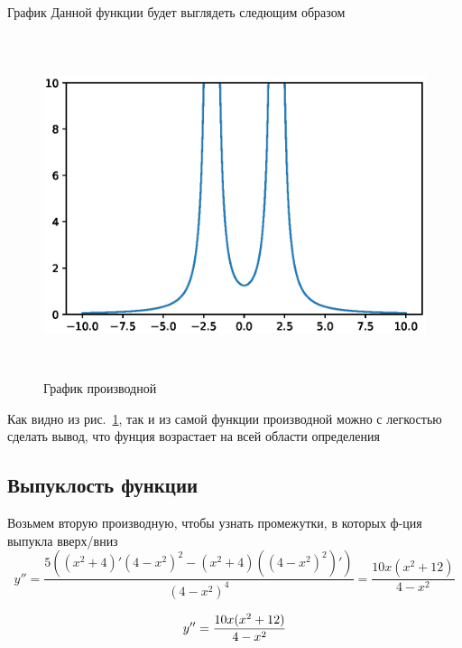    График Данной функции будет выглядеть следющим образом \cite{matplotlib}
    \begin{figure}[H]
        \centering
        \includegraphics[height=10cm, width=15cm]{fig/firstDer.eps}
        \caption{График производной}
        \label{pic:derivative}
    \end{figure}
    Как видно из рис.~\ref{pic:derivative}, так и из самой функции производной можно с легкостью сделать вывод, что фунция возрастает на всей области определения
    
    

    
    
\subsection{Выпуклость функции}
    Возьмем вторую производную, чтобы узнать промежутки, в которых ф-ция выпукла вверх/вниз
    \begin{equation*}
        y'' = \frac{5((x^2+4)'(4-x^2)^2-(x^2+4)((4-x^2)^2)')}{(4-x^2)^4} =
        \frac{10x(x^2+12)}{4-x^2}
    \end{equation*}
    
    \begin{equation}
        \centering
        \label{eq:eq3}
        y'' =  \frac{10x(x^2+12)}{4-x^2}
    \end{equation}
    
